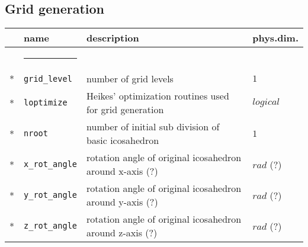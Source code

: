 %

\subsection{Grid generation}  
\begin{tabular}{l l l l}  
& \parbox{.15\textwidth}{name} & \parbox{.65\textwidth}{description} & 
\parbox{.1\textwidth}{phys.dim.} \\ \hline  
& \rule{4ex}{0pt} & \\[-10pt]  
* & \texttt{grid\_level}  & number of grid levels & $1$ \\
%
* & \texttt{loptimize}  & Heikes' optimization routines used for grid 
generation & $logical$ \\  
* & \texttt{nroot}  & number of initial sub division of basic icosahedron & 
$1$ \\
* & \texttt{x\_rot\_angle}  & rotation angle of original icosahedron around 
x-axis (?) & $rad$ (?) \\
* & \texttt{y\_rot\_angle}  & rotation angle of original icosahedron around 
y-axis (?) & $rad$ (?) \\
* & \texttt{z\_rot\_angle}  & rotation angle of original icosahedron around 
z-axis (?) & $rad$ (?)
\end{tabular}  
